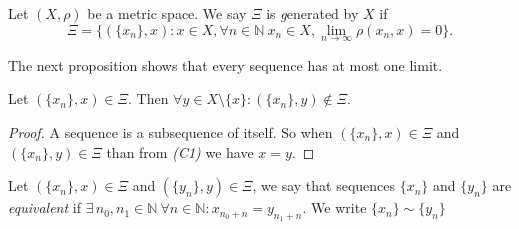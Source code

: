 \begin{define}\label{def:gen}
Let $(X,\rho)$ be a metric space. We say $\Xi$ is {\emph generated by} $X$ if 
\[
	\Xi=\{(\{x_n\},x): x\in X, \forall n\in \mathbb{N}\ x_n\in X, \lim_{n \to \infty} \rho(x_n,x)=0\}.
\]
\end{define}

The next proposition shows that every sequence has at most one limit.

\begin{theorem} \label{th:onelim}
Let $(\{x_n\},x)\in\Xi$. Then $\forall y\in X\setminus\{x\}: (\{x_n\},y)\notin\Xi$.
\end{theorem} 
\begin{proof} 
	A sequence is a subsequence of itself. So when $(\{x_n\},x)\in\Xi$ and $(\{x_n\},y)\in\Xi$ than from \emph{(C1)} we have $x=y$.
\end{proof}

\begin{define}\label{def:ekv}
Let $(\{x_n\},x)\in\Xi$ and $(\{y_n\},y)\in\Xi$, we say that sequences $\{x_n\}$ and $\{y_n\}$ are \emph{equivalent} if $\exists\, n_0, n_1 \in \mathbb{N}\ \forall n \in \mathbb{N}: x_{n_0+n}=y_{n_1+n}$. We write $\{x_n\} \sim \{y_n\}$
\end{define}

